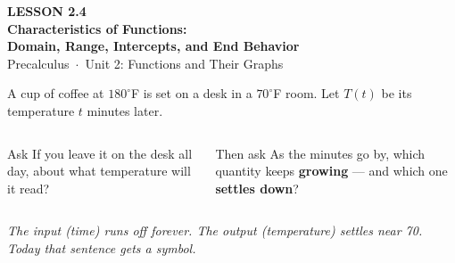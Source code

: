 \documentclass[aspectratio=169, 11pt]{beamer}
\begin{document}
{
\begin{frame}[plain]
  \vspace{2.6cm}\hspace{0.55cm}%
  \begin{minipage}{0.9\textwidth}
    {\color{goldacc}\bfseries\small LESSON 2.4}\\[0.5cm]
    {\color{white}\bfseries\Large Characteristics of Functions:\\[2pt]
     Domain, Range, Intercepts, and End Behavior}\\[1.1cm]
    {\color{lilacmid}\small Precalculus~$\cdot$~Unit 2: Functions and Their Graphs}
  \end{minipage}
\end{frame}
}

\begin{frame}[t, plain]

  A cup of coffee at \(180^\circ\)F is set on a desk in a \(70^\circ\)F room. Let
  \(T(t)\) be its temperature \(t\) minutes later.

  \bigskip
  \begin{columns}[T]
      \begin{block}{Ask}
        If you leave it on the desk all day, about what temperature will it read?
      \end{block}

      \begin{block}{Then ask}
        As the minutes go by, which quantity keeps \textbf{growing} --- and which one
        \textbf{settles down}?
      \end{block}
  \end{columns}

  \bigskip
  \textit{The input (time) runs off forever. The output (temperature) settles near 70.
  Today that sentence gets a symbol.}
\end{frame}
\end{document}
